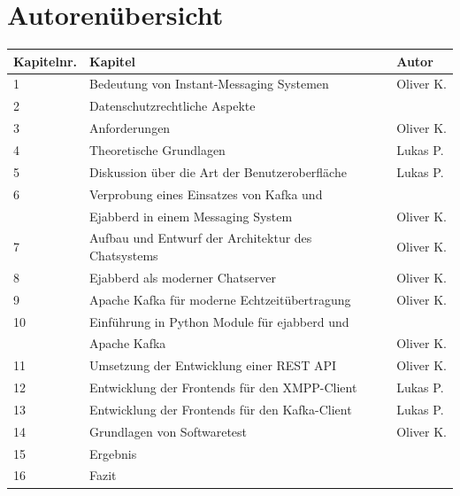 \documentclass[a4paper,titlepage,halfparskip,12pt]{scrreprt}
\begin{document}
\renewcommand{\sectionmark}[1]{\markright{\thesection\ #1}} %



\newpage
{}

\chapter*{Autorenübersicht}
\renewcommand{\arraystretch}{1.5}
\begin{table}[h]
	\centering
	\begin{tabular*}{\linewidth}{lll@{\extracolsep{\fill}}}
		\textbf{Kapitelnr.} & \textbf{Kapitel} & \textbf{Autor} \\
		\hline
		1 & Bedeutung von Instant-Messaging Systemen & Oliver K. \\
		2 & Datenschutzrechtliche Aspekte & \\
		3 & Anforderungen & Oliver K. \\
		4 & Theoretische Grundlagen & Lukas P. \\
		5 & Diskussion über die Art der Benutzeroberfläche & Lukas P.\\
		6 & Verprobung eines Einsatzes von Kafka und &\\
		&Ejabberd in einem Messaging System & Oliver K.\\
		7 & Aufbau und Entwurf der Architektur des Chatsystems & Oliver K.\\
		8 & Ejabberd als moderner Chatserver & Oliver K.\\
		9 & Apache Kafka für moderne Echtzeitübertragung & Oliver K.\\
		10 & Einführung in Python Module für ejabberd und &\\
		& Apache Kafka & Oliver K.\\
		11 & Umsetzung der Entwicklung einer REST API & Oliver K.\\
		12 & Entwicklung der Frontends für den XMPP-Client & Lukas P.\\
		13 & Entwicklung der Frontends für den Kafka-Client & Lukas P.\\
		14 & Grundlagen von Softwaretest & Oliver K.\\
		15 & Ergebnis & \\
		16 & Fazit & \\
	\end{tabular*}
	\label{tab:autorenuebersicht}
\end{table}
\end{document}

